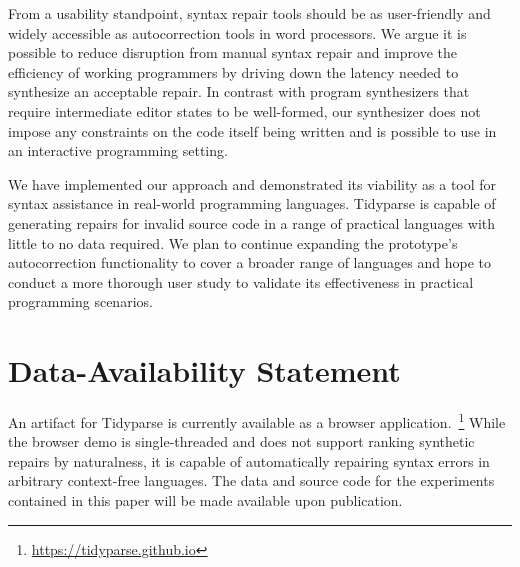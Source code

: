 \documentclass[runningheads]{llncs}
\begin{document}
  From a usability standpoint, syntax repair tools should be as user-friendly and widely accessible as autocorrection tools in word processors. We argue it is possible to reduce disruption from manual syntax repair and improve the efficiency of working programmers by driving down the latency needed to synthesize an acceptable repair. In contrast with program synthesizers that require intermediate editor states to be well-formed, our synthesizer does not impose any constraints on the code itself being written and is possible to use in an interactive programming setting.


  We have implemented our approach and demonstrated its viability as a tool for syntax assistance in real-world programming languages. Tidyparse is capable of generating repairs for invalid source code in a range of practical languages with little to no data required. We plan to continue expanding the prototype's autocorrection functionality to cover a broader range of languages and hope to conduct a more thorough user study to validate its effectiveness in practical programming scenarios.

  \section*{Data-Availability Statement}

  An artifact for Tidyparse is currently available as a browser application.~\footnote{\url{https://tidyparse.github.io}} While the browser demo is single-threaded and does not support ranking synthetic repairs by naturalness, it is capable of automatically repairing syntax errors in arbitrary context-free languages. The data and source code for the experiments contained in this paper will be made available upon publication.

%
\end{document}
